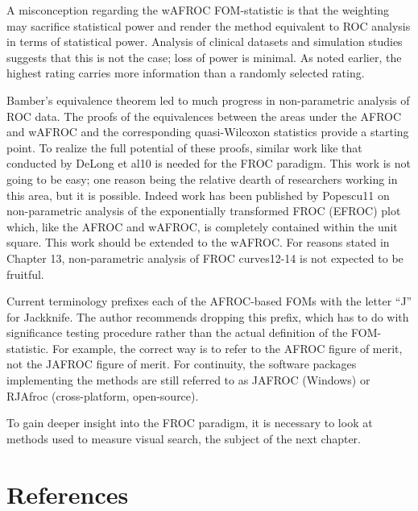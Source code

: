 \documentclass[
]{book}
\begin{document}
A misconception regarding the wAFROC FOM-statistic is that the weighting may sacrifice statistical power and render the method equivalent to ROC analysis in terms of statistical power. Analysis of clinical datasets and simulation studies suggests that this is not the case; loss of power is minimal. As noted earlier, the highest rating carries more information than a randomly selected rating.

Bamber's equivalence theorem led to much progress in non-parametric analysis of ROC data. The proofs of the equivalences between the areas under the AFROC and wAFROC and the corresponding quasi-Wilcoxon statistics provide a starting point. To realize the full potential of these proofs, similar work like that conducted by DeLong et al10 is needed for the FROC paradigm. This work is not going to be easy; one reason being the relative dearth of researchers working in this area, but it is possible. Indeed work has been published by Popescu11 on non-parametric analysis of the exponentially transformed FROC (EFROC) plot which, like the AFROC and wAFROC, is completely contained within the unit square. This work should be extended to the wAFROC. For reasons stated in Chapter 13, non-parametric analysis of FROC curves12-14 is not expected to be fruitful.

Current terminology prefixes each of the AFROC-based FOMs with the letter ``J'' for Jackknife. The author recommends dropping this prefix, which has to do with significance testing procedure rather than the actual definition of the FOM-statistic. For example, the correct way is to refer to the AFROC figure of merit, not the JAFROC figure of merit. For continuity, the software packages implementing the methods are still referred to as JAFROC (Windows) or RJAfroc (cross-platform, open-source).

To gain deeper insight into the FROC paradigm, it is necessary to look at methods used to measure visual search, the subject of the next chapter.

\hypertarget{froc-meanings-references}{%
\section{References}\label{froc-meanings-references}}

  
\end{document}
